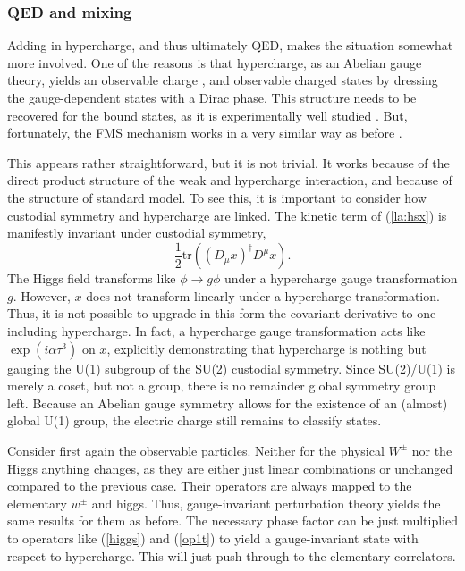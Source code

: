 \documentclass[final,12pt,3p,longtitle]{elsarticle}
\newcommand*{\no}{\noindent}
\newcommand*{\be}{\begin{equation}}
\newcommand*{\ee}{\end{equation}}
\newcommand*{\pref}[1]{(\ref{#1})}
\newcommand*{\nn}{\nonumber}
\newcommand*{\tr}{\mathrm{tr}}
\newcommand*{\1}{1\!\!\!\bot}
\begin{document}
\subsubsection{QED and mixing}\label{ss:qed}

Adding in hypercharge, and thus ultimately QED, makes the situation somewhat more involved. One of the reasons is that hypercharge, as an Abelian gauge theory, yields an observable charge \cite{Haag:1992hx}, and observable charged states by dressing the gauge-dependent states with a Dirac phase. This structure needs to be recovered for the bound states, as it is experimentally well studied \cite{pdg}. But, fortunately, the FMS mechanism works in a very similar way as before \cite{Frohlich:1980gj,Frohlich:1981yi,Shrock:1985ur,Shrock:1986av}.

This appears rather straightforward, but it is not trivial. It works because of the direct product structure of the weak and hypercharge interaction, and because of the structure of standard model. To see this, it is important to consider how custodial symmetry and hypercharge are linked. The kinetic term of \pref{la:hsx} is manifestly invariant under custodial symmetry,
\be
\frac{1}{2}\tr\left((D_\mu x)^\dagger D^\mu x\right)\nn.
\ee
\no The Higgs field transforms like $\phi\to g\phi$ under a hypercharge gauge transformation $g$. However, $x$ does not transform linearly under a hypercharge transformation. Thus, it is not possible to upgrade in this form the covariant derivative to one including hypercharge. In fact, a hypercharge gauge transformation acts like $\exp(i\alpha\tau^3)$ on $x$, explicitly demonstrating that hypercharge is nothing but gauging the U(1) subgroup of the SU(2) custodial symmetry. Since SU(2)/U(1) is merely a coset, but not a group, there is no remainder global symmetry group left. Because an Abelian gauge symmetry allows for the existence of an (almost) global U(1) group, the electric charge still remains to classify states.

Consider first again the observable particles. Neither for the physical $W^\pm$ nor the Higgs anything changes, as they are either just linear combinations or unchanged compared to the previous case. Their operators are always mapped to the elementary $w^\pm$ and higgs. Thus, gauge-invariant perturbation theory yields the same results for them as before. The necessary phase factor can be just multiplied to operators like \pref{higgs} and \pref{op1t} to yield a gauge-invariant state with respect to hypercharge. This will just push through to the elementary correlators.
\end{document}
